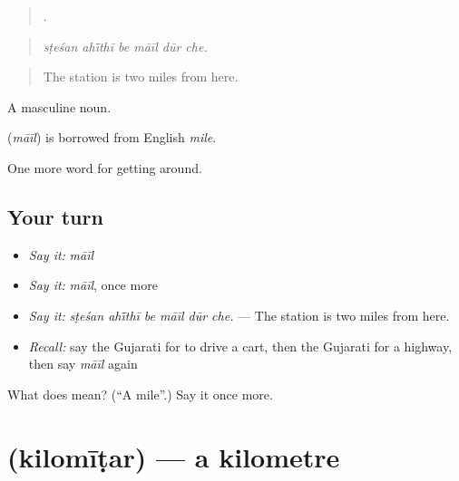 \begin{quote}
     .
\end{quote}

\begin{quote}
\emph{sṭeśan ahī̃thī be māīl dūr che.}
\end{quote}

\begin{quote}
The station is two miles from here.
\end{quote}

A masculine noun.

\begin{cousinweb}
\textbf{} (\emph{māīl}) is borrowed from English \emph{mile}.
\end{cousinweb}

\begin{grammarlens}[title={What you've built}]
One more word for getting around.
\end{grammarlens}

\subsection*{Your turn}
\begin{itemize}
\raggedright
  \item \emph{Say it:} \emph{māīl}
  \item \emph{Say it:} \emph{māīl}, once more
  \item \emph{Say it:} \emph{sṭeśan ahī̃thī be māīl dūr che.} — The station is two miles from here.
  \item \emph{Recall:} say the Gujarati for to drive a cart, then the Gujarati for a highway, then say \emph{māīl} again
\end{itemize}

\begin{tcolorbox}[breakable,colback=teal!4,colframe=teal!35!black,title={Before you move on}]
What does  mean? (\textquotedblleft{}A mile\textquotedblright{}.) Say it once more.
\end{tcolorbox}
\section[\texorpdfstring{\gu{કિલોમીટર} (kilomīṭar)}{કિલોમીટર (kilomīṭar)}]{ (kilomīṭar) — a kilometre}

\label{lesson:GU-C403-kilomitar}



